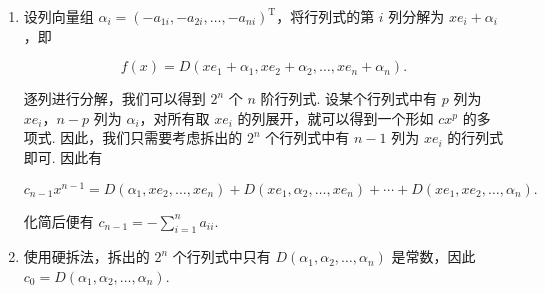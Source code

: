 \documentclass[12pt,fontset=fandol]{ctexart}
\begin{document}
\begin{solve}
\begin{enumerate}
        \item 设列向量组 $\alpha_i = (-a_{1i}, -a_{2i}, \ldots, -a_{ni})^{\mathrm{T}}$，将行列式的第 $i$ 列分解为 $xe_i + \alpha_i$，即

            \[
                f(x) = D(xe_1 + \alpha_1, xe_2 + \alpha_2, \ldots, xe_n + \alpha_n).
            \]

            逐列进行分解，我们可以得到 $2^n$ 个 $n$ 阶行列式. 设某个行列式中有 $p$ 列为 $xe_i$，$n-p$ 列为 $\alpha_i$，对所有取 $xe_i$ 的列展开，就可以得到一个形如 $cx^p$ 的多项式. 因此，我们只需要考虑拆出的 $2^n$ 个行列式中有 $n-1$ 列为 $xe_i$ 的行列式即可. 因此有

            \[
                c_{n-1}x^{n-1} = D(\alpha_1, xe_2, \ldots, xe_n) + D(xe_1, \alpha_2, \ldots, xe_n) + \cdots + D(xe_1, xe_2, \ldots, \alpha_n).
            \]

            化简后便有 $c_{n-1} = -\displaystyle\sum_{i=1}^n a_{ii}$.

        \item 使用硬拆法，拆出的 $2^n$ 个行列式中只有 $D(\alpha_1, \alpha_2, \ldots, \alpha_n)$ 是常数，因此 $c_0 = D(\alpha_1, \alpha_2, \ldots, \alpha_n)$.
    \end{enumerate}
\end{solve}
\end{document}
